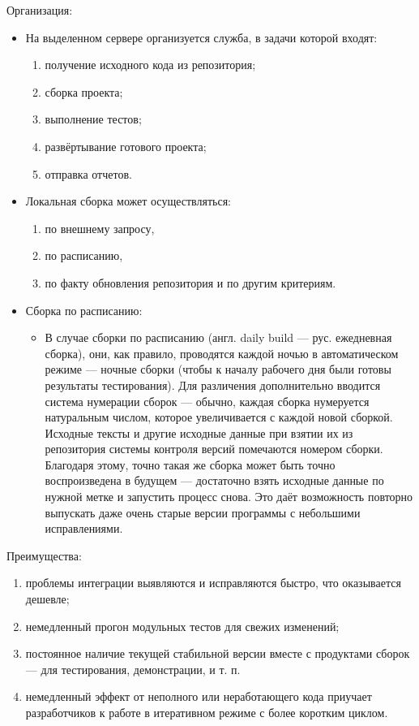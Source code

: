\documentclass{article}
\begin{document}
    Организация:
    \begin{itemize}
        \item На выделенном сервере организуется служба, в задачи которой входят:
        \begin{enumerate}
            \item получение исходного кода из репозитория;
            \item сборка проекта;
            \item выполнение тестов;
            \item развёртывание готового проекта;
            \item отправка отчетов.
        \end{enumerate}
        \item Локальная сборка может осуществляться:
        \begin{enumerate}
            \item по внешнему запросу,
            \item по расписанию,
            \item по факту обновления репозитория и по другим критериям.
        \end{enumerate}
        \item Сборка по расписанию:
        \begin{itemize}
            \item В случае сборки по расписанию (англ. daily build — рус. ежедневная сборка), они, как правило, проводятся каждой ночью в автоматическом режиме — ночные сборки (чтобы к началу рабочего дня были готовы результаты тестирования). Для различения дополнительно вводится система нумерации сборок — обычно, каждая сборка нумеруется натуральным числом, которое увеличивается с каждой новой сборкой. Исходные тексты и другие исходные данные при взятии их из репозитория системы контроля версий помечаются номером сборки. Благодаря этому, точно такая же сборка может быть точно воспроизведена в будущем — достаточно взять исходные данные по нужной метке и запустить процесс снова. Это даёт возможность повторно выпускать даже очень старые версии программы с небольшими исправлениями.
        \end{itemize}
    \end{itemize}

    Преимущества:
    \begin{enumerate}
        \item проблемы интеграции выявляются и исправляются быстро, что оказывается дешевле;
        \item немедленный прогон модульных тестов для свежих изменений;
        \item постоянное наличие текущей стабильной версии вместе с продуктами сборок — для тестирования, демонстрации, и т. п.
        \item немедленный эффект от неполного или неработающего кода приучает разработчиков к работе в итеративном режиме с более коротким циклом.
    \end{enumerate}
\end{document}
